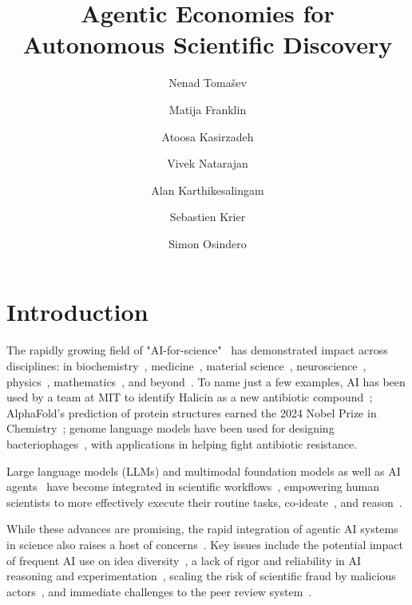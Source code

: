 \documentclass[11pt, a4paper, twocolumn, goog]{google}
\title{Agentic Economies for Autonomous Scientific Discovery}
\author[1]{Nenad Toma\v{s}ev}
\author[1]{Matija Franklin}
\author[1]{Atoosa Kasirzadeh}
\author[1]{Vivek Natarajan}
\author[1]{Alan Karthikesalingam}
\author[1]{Sebastien Krier}
\author[1]{Simon Osindero}
\affil[*]{Equal contributions}
\affil[1]{Google DeepMind}
\begin{document}
\maketitle

\section{Introduction}

The rapidly growing field of "AI-for-science"~\citep{xu2021artificial, van2023ai, wang2023scientific} has demonstrated impact across disciplines: in biochemistry~\citep{jumper2021highly, evans2021protein, varadi2022alphafold, varadi2024alphafold, hao2024large, he2025generalized, avsec2025alphagenome, dalla2025nucleotide, anthenz}, medicine~\citep{zhang2023biomedclip, azad2023foundationalmodelsmedicalimaging, guo2023ehr, chia2024foundation, guo2024multi, ma2025fully, bluethgen2025vision, lau2026toward}, material science~\citep{li2020ai, guo2021artificial, merchant2023scaling, ning2026autoresearchmaterialsauditable}, neuroscience~\citep{caro2023brainlm, cui2024neuro, dong2024brain, sun2025foundation}, physics~\citep{birk2024omnijet, nguyen2025physix, park2025fm4nppscalingfoundationmodel}, mathematics~\citep{feng2026semiautonomousmathematicsdiscoverygemini, feng2026towards, oaimath, tao2026mathematicsageai, nsoai}, and beyond~\citep{park2023papers, parker2024astroclip, bodnar2025foundation, yan2026omniqecdiscoveringpracticalquantum}. To name just a few examples, AI has been used by a team at MIT to identify Halicin as a new antibiotic compound~\citep{stokes2020deep}; AlphaFold's prediction of protein structures earned the 2024 Nobel Prize in Chemistry~\citep{jumper2021highly}; genome language models have been used for designing bacteriophages~\citep{king2026generative}, with applications in helping fight antibiotic resistance.

Large language models (LLMs) and multimodal foundation models \citep{bommasani2021opportunities} as well as AI agents~\citep{kasirzadeh2026agentic} have become integrated in scientific workflows~\citep{boyko2023interdisciplinary, kusumegi2025scientific}, empowering human scientists to more effectively execute their routine tasks, co-ideate~\citep{gottweis2025aicoscientist}, and reason~\citep{kiciman2023causal, truhn2023large, ma2024sciagent, yan2025position}. 

While these advances are promising, the rapid integration of agentic AI systems in science also raises a host of concerns~\citep{birhane2023science}. Key issues include the potential impact of frequent AI use on idea diversity~\citep{meincke2025chatgpt, traberg2026ai, hao2026artificial}, a lack of rigor and reliability in AI reasoning and experimentation~\citep{luo2025more, zhu2025ai, rios2026ai}, scaling the risk of scientific fraud by malicious actors~\citep{gyevnar2026distributed}, and immediate challenges to the peer review system~\citep{naddaf2025ai, mann2026aifutureacademicpeer}. 
\end{document}
